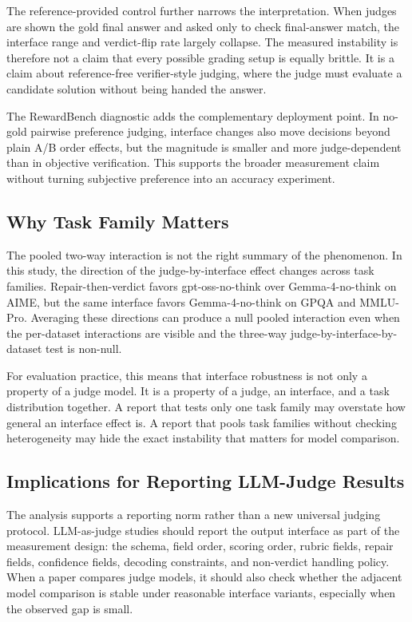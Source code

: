 \documentclass[journal]{IEEEtran}
\begin{document}
The reference-provided control further narrows the interpretation. When judges are shown the gold final answer and asked only to check final-answer match, the interface range and verdict-flip rate largely collapse. The measured instability is therefore not a claim that every possible grading setup is equally brittle. It is a claim about reference-free verifier-style judging, where the judge must evaluate a candidate solution without being handed the answer.

The RewardBench diagnostic adds the complementary deployment point. In no-gold pairwise preference judging, interface changes also move decisions beyond plain A/B order effects, but the magnitude is smaller and more judge-dependent than in objective verification. This supports the broader measurement claim without turning subjective preference into an accuracy experiment.

\subsection{Why Task Family Matters}
\label{sec:discussion-task-family}

The pooled two-way interaction is not the right summary of the phenomenon. In this study, the direction of the judge-by-interface effect changes across task families. Repair-then-verdict favors gpt-oss-no-think over Gemma-4-no-think on AIME, but the same interface favors Gemma-4-no-think on GPQA and MMLU-Pro. Averaging these directions can produce a null pooled interaction even when the per-dataset interactions are visible and the three-way judge-by-interface-by-dataset test is non-null.

For evaluation practice, this means that interface robustness is not only a property of a judge model. It is a property of a judge, an interface, and a task distribution together. A report that tests only one task family may overstate how general an interface effect is. A report that pools task families without checking heterogeneity may hide the exact instability that matters for model comparison.

\subsection{Implications for Reporting LLM-Judge Results}
\label{sec:discussion-practical}

The analysis supports a reporting norm rather than a new universal judging protocol. LLM-as-judge studies should report the output interface as part of the measurement design: the schema, field order, scoring order, rubric fields, repair fields, confidence fields, decoding constraints, and non-verdict handling policy. When a paper compares judge models, it should also check whether the adjacent model comparison is stable under reasonable interface variants, especially when the observed gap is small.
\end{document}
